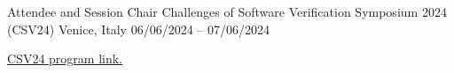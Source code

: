 \begin{cventries}
    \vspace{-.7em}  %
    \hspace*{-.4em} %

    \cventry
        {Attendee and Session Chair} %
        {Challenges of Software Verification Symposium 2024 (CSV24)} %
        {Venice, Italy} %
        {06/06/2024 – 07/06/2024} %
        {
        \begin{cvitems} %
            \item {\href{https://unive-ssv.github.io/events/2024/06/06/csv.html}{CSV24 program link.}}
        \end{cvitems}
        }
\end{cventries}
